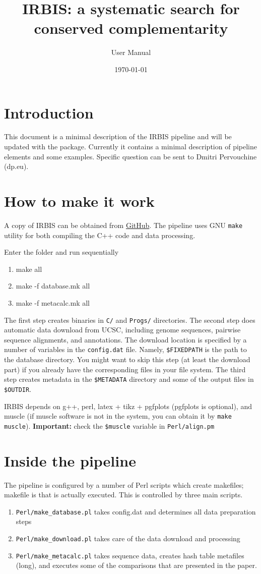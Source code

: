 \documentclass{article}
\title{IRBIS: a systematic search for conserved complementarity}
\author{\sc User Manual}
\date{\today}
\begin{document}
\maketitle
\tableofcontents
\section{Introduction}
This document is  a minimal description of the IRBIS pipeline and will be updated with the package. Currently it 
contains a minimal description of pipeline elements and some examples. Specific question can be sent to Dmitri 
Pervouchine (dp\@crg.eu).

\section{How to make it work}
A copy of IRBIS can be obtained from \href{https://github.com/pervouchine/irbis}{GitHub}. 
The pipeline uses GNU {\tt make} utility for both compiling the C++ code and data processing. 

Enter the folder and run sequentially
\begin{enumerate} 
\tt
\item make all
\item make -f database.mk all
\item make -f metacalc.mk all
\end{enumerate}

The first step creates binaries in {\tt C/} and {\tt Progs/} directories. The second step does automatic data download 
from UCSC, including genome sequences, pairwise sequence alignments, and annotations. The download location is specified 
by a number of variables in the {\tt config.dat} file. Namely, {\tt \$FIXEDPATH} is the path to the database directory. 
You might want to skip this step (at least the download part) if you already have the corresponding files in your file 
system. The third step creates metadata in the {\tt \$METADATA} directory and some of the output files in {\tt \$OUTDIR}.

IRBIS depends on g++, perl, latex + tikz + pgfplots (pgfplots is optional), and muscle (if muscle software is 
not in the system, you can obtain it by {\tt make muscle}). {\bf Important:} check the {\tt \$muscle} variable in {\tt Perl/align.pm}

\section{Inside the pipeline}
The pipeline is configured by a number of Perl scripts which create makefiles; makefile is that is actually executed. This is 
controlled by three main scripts.
\begin{enumerate}
\item {\tt Perl/make\_database.pl} takes config.dat and determines all data preparation steps
\item {\tt Perl/make\_download.pl} takes care of the data download and processing
\item {\tt Perl/make\_metacalc.pl} takes sequence data, creates hash table metafiles (long), and executes some of the comparisons 
that are presented in the paper.
\end{enumerate}
\end{document}
